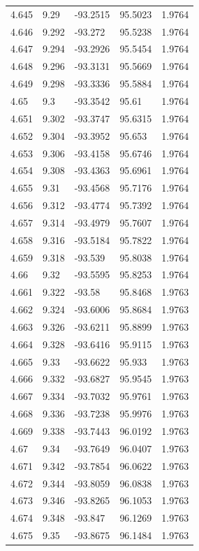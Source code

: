\begin{tabular}{lllll}
4.645 & 9.29 & -93.2515 & 95.5023 & 1.9764 \\
4.646 & 9.292 & -93.272 & 95.5238 & 1.9764 \\
4.647 & 9.294 & -93.2926 & 95.5454 & 1.9764 \\
4.648 & 9.296 & -93.3131 & 95.5669 & 1.9764 \\
4.649 & 9.298 & -93.3336 & 95.5884 & 1.9764 \\
4.65 & 9.3 & -93.3542 & 95.61 & 1.9764 \\
4.651 & 9.302 & -93.3747 & 95.6315 & 1.9764 \\
4.652 & 9.304 & -93.3952 & 95.653 & 1.9764 \\
4.653 & 9.306 & -93.4158 & 95.6746 & 1.9764 \\
4.654 & 9.308 & -93.4363 & 95.6961 & 1.9764 \\
4.655 & 9.31 & -93.4568 & 95.7176 & 1.9764 \\
4.656 & 9.312 & -93.4774 & 95.7392 & 1.9764 \\
4.657 & 9.314 & -93.4979 & 95.7607 & 1.9764 \\
4.658 & 9.316 & -93.5184 & 95.7822 & 1.9764 \\
4.659 & 9.318 & -93.539 & 95.8038 & 1.9764 \\
4.66 & 9.32 & -93.5595 & 95.8253 & 1.9764 \\
4.661 & 9.322 & -93.58 & 95.8468 & 1.9763 \\
4.662 & 9.324 & -93.6006 & 95.8684 & 1.9763 \\
4.663 & 9.326 & -93.6211 & 95.8899 & 1.9763 \\
4.664 & 9.328 & -93.6416 & 95.9115 & 1.9763 \\
4.665 & 9.33 & -93.6622 & 95.933 & 1.9763 \\
4.666 & 9.332 & -93.6827 & 95.9545 & 1.9763 \\
4.667 & 9.334 & -93.7032 & 95.9761 & 1.9763 \\
4.668 & 9.336 & -93.7238 & 95.9976 & 1.9763 \\
4.669 & 9.338 & -93.7443 & 96.0192 & 1.9763 \\
4.67 & 9.34 & -93.7649 & 96.0407 & 1.9763 \\
4.671 & 9.342 & -93.7854 & 96.0622 & 1.9763 \\
4.672 & 9.344 & -93.8059 & 96.0838 & 1.9763 \\
4.673 & 9.346 & -93.8265 & 96.1053 & 1.9763 \\
4.674 & 9.348 & -93.847 & 96.1269 & 1.9763 \\
4.675 & 9.35 & -93.8675 & 96.1484 & 1.9763 \\

\end{tabular}
